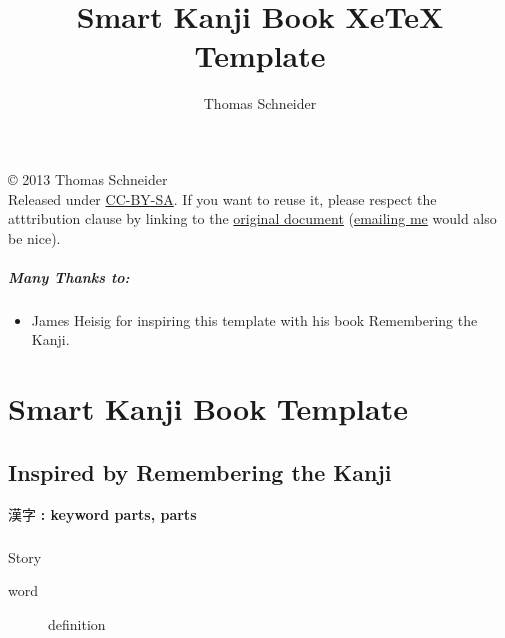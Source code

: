 \documentclass[a4paper, 12pt]{book}
\title{Smart Kanji Book XeTeX Template}
\author{Thomas Schneider}
\date{ }
\begin{document}
\maketitle
\begin{center}
© 2013 Thomas Schneider\\
Released under \href{https://creativecommons.org/licenses/by-sa/2.0/}{CC-BY-SA}. If you want to reuse it, please respect the atttribution clause by linking to the \href{http://smartkanjibook.com/wp-content/uploads/2013/11/free_sample.pdf}{original document} (\href{mailto:ts@domainname.com}{emailing me} would also be nice).
\end{center}
\vfill
\paragraph{Many Thanks to:}
\begin{itemize}
\item James Heisig for inspiring this template with his book Remembering the Kanji.
\end{itemize}

\chapter*{Smart Kanji Book Template}
\section*{Inspired by Remembering the Kanji}

\begin{mdframed}
  {\fontsize{3em}{3.6em}\selectfont 漢字  } 
  \textbf{ {\Large : keyword } \hfill {\large parts, parts}}
  \paragraph{} Story
  \begin{description}
    \item[word] definition
  \end{description}
\end{mdframed}
\end{document}
